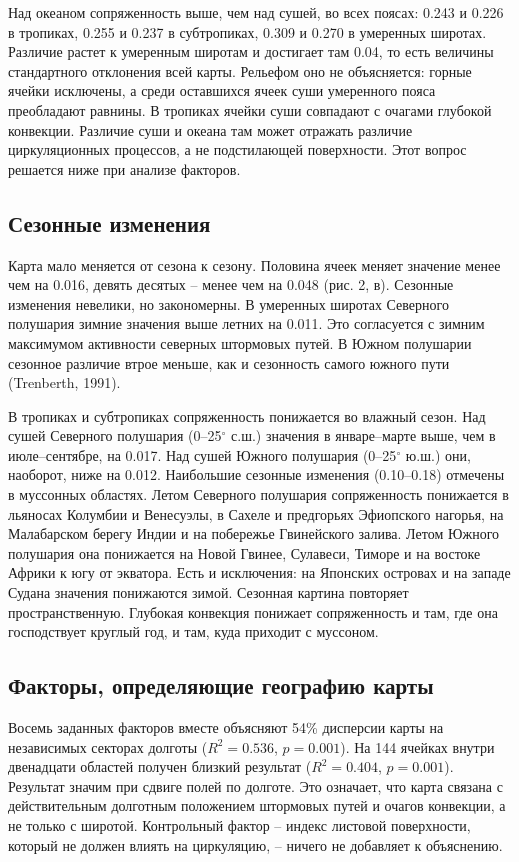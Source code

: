 \documentclass[12pt,a4paper]{article}
\begin{document}
Над океаном сопряженность выше, чем над сушей, во всех поясах: 0.243 и 0.226 в тропиках, 0.255 и 0.237 в субтропиках, 0.309 и 0.270 в умеренных широтах. Различие растет к умеренным широтам и достигает там 0.04, то есть величины стандартного отклонения всей карты. Рельефом оно не объясняется: горные ячейки исключены, а среди оставшихся ячеек суши умеренного пояса преобладают равнины. В тропиках ячейки суши совпадают с очагами глубокой конвекции. Различие суши и океана там может отражать различие циркуляционных процессов, а не подстилающей поверхности. Этот вопрос решается ниже при анализе факторов.

\subsection{Сезонные изменения}

Карта мало меняется от сезона к сезону. Половина ячеек меняет значение менее чем на 0.016, девять десятых -- менее чем на 0.048 (рис. 2, в). Сезонные изменения невелики, но закономерны. В умеренных широтах Северного полушария зимние значения выше летних на 0.011. Это согласуется с зимним максимумом активности северных штормовых путей. В Южном полушарии сезонное различие втрое меньше, как и сезонность самого южного пути (Trenberth, 1991).

В тропиках и субтропиках сопряженность понижается во влажный сезон. Над сушей Северного полушария (0--25$^\circ$ с.ш.) значения в январе--марте выше, чем в июле--сентябре, на 0.017. Над сушей Южного полушария (0--25$^\circ$ ю.ш.) они, наоборот, ниже на 0.012. Наибольшие сезонные изменения (0.10--0.18) отмечены в муссонных областях. Летом Северного полушария сопряженность понижается в льяносах Колумбии и Венесуэлы, в Сахеле и предгорьях Эфиопского нагорья, на Малабарском берегу Индии и на побережье Гвинейского залива. Летом Южного полушария она понижается на Новой Гвинее, Сулавеси, Тиморе и на востоке Африки к югу от экватора. Есть и исключения: на Японских островах и на западе Судана значения понижаются зимой. Сезонная картина повторяет пространственную. Глубокая конвекция понижает сопряженность и там, где она господствует круглый год, и там, куда приходит с муссоном.

\subsection{Факторы, определяющие географию карты}

Восемь заданных факторов вместе объясняют 54\% дисперсии карты на независимых секторах долготы ($R^2 = 0.536$, $p = 0.001$). На 144 ячейках внутри двенадцати областей получен близкий результат ($R^2 = 0.404$, $p = 0.001$). Результат значим при сдвиге полей по долготе. Это означает, что карта связана с действительным долготным положением штормовых путей и очагов конвекции, а не только с широтой. Контрольный фактор -- индекс листовой поверхности, который не должен влиять на циркуляцию, -- ничего не добавляет к объяснению.
\end{document}
